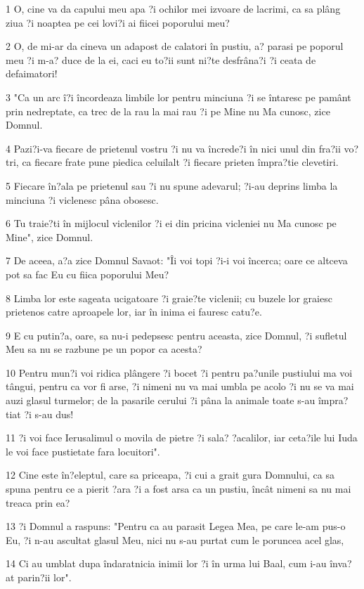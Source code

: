 \par 1 O, cine va da capului meu apa ?i ochilor mei izvoare de lacrimi, ca sa plâng ziua ?i noaptea pe cei lovi?i ai fiicei poporului meu?
\par 2 O, de mi-ar da cineva un adapost de calatori în pustiu, a? parasi pe poporul meu ?i m-a? duce de la ei, caci eu to?ii sunt ni?te desfrâna?i ?i ceata de defaimatori!
\par 3 "Ca un arc î?i încordeaza limbile lor pentru minciuna ?i se întaresc pe pamânt prin nedreptate, ca trec de la rau la mai rau ?i pe Mine nu Ma cunosc, zice Domnul.
\par 4 Pazi?i-va fiecare de prietenul vostru ?i nu va încrede?i în nici unul din fra?ii vo?tri, ca fiecare frate pune piedica celuilalt ?i fiecare prieten împra?tie clevetiri.
\par 5 Fiecare în?ala pe prietenul sau ?i nu spune adevarul; ?i-au deprins limba la minciuna ?i viclenesc pâna obosesc.
\par 6 Tu traie?ti în mijlocul viclenilor ?i ei din pricina vicleniei nu Ma cunosc pe Mine", zice Domnul.
\par 7 De aceea, a?a zice Domnul Savaot: "Îi voi topi ?i-i voi încerca; oare ce altceva pot sa fac Eu cu fiica poporului Meu?
\par 8 Limba lor este sageata ucigatoare ?i graie?te viclenii; cu buzele lor graiesc prietenos catre aproapele lor, iar în inima ei fauresc catu?e.
\par 9 E cu putin?a, oare, sa nu-i pedepsesc pentru aceasta, zice Domnul, ?i sufletul Meu sa nu se razbune pe un popor ca acesta?
\par 10 Pentru mun?i voi ridica plângere ?i bocet ?i pentru pa?unile pustiului ma voi tângui, pentru ca vor fi arse, ?i nimeni nu va mai umbla pe acolo ?i nu se va mai auzi glasul turmelor; de la pasarile cerului ?i pâna la animale toate s-au împra?tiat ?i s-au dus!
\par 11 ?i voi face Ierusalimul o movila de pietre ?i sala? ?acalilor, iar ceta?ile lui Iuda le voi face pustietate fara locuitori".
\par 12 Cine este în?eleptul, care sa priceapa, ?i cui a grait gura Domnului, ca sa spuna pentru ce a pierit ?ara ?i a fost arsa ca un pustiu, încât nimeni sa nu mai treaca prin ea?
\par 13 ?i Domnul a raspuns: "Pentru ca au parasit Legea Mea, pe care le-am pus-o Eu, ?i n-au ascultat glasul Meu, nici nu s-au purtat cum le poruncea acel glas,
\par 14 Ci au umblat dupa îndaratnicia inimii lor ?i în urma lui Baal, cum i-au înva?at parin?ii lor".

